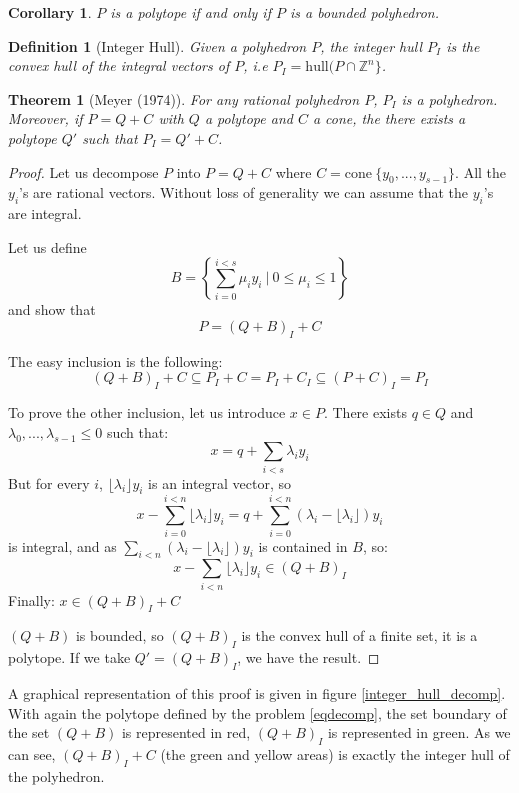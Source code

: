 \documentclass{article}
\newcommand{\cone}{\mathrm{cone}}
\newcommand{\hull}{\mathrm{hull}}
\newcommand{\ints}{\mathbb{Z}}
\newcommand{\ifff}{if and only if}
\newtheorem{definition}{Definition}
\newtheorem{theorem}{Theorem}
\newtheorem{corollary}{Corollary}
\begin{document}
\begin{corollary}
  $P$ is a polytope \ifff{} $P$ is a bounded polyhedron.
\end{corollary}

\begin{definition}[Integer Hull]
  Given a polyhedron $P$, the \textup{integer hull} $P_I$ is the convex hull of
  the integral vectors of $P$, i.e $P_I = \hull (P \cap \ints^n\}$.
\end{definition}

\begin{theorem}[Meyer (1974)]
  For any rational polyhedron $P$, $P_I$ is a polyhedron. Moreover, if
  $P = Q + C$ with $Q$ a polytope and $C$ a cone, the there exists a polytope
  $Q'$ such that $P_I = Q' + C$.
\end{theorem}
\begin{proof}
  Let us decompose $P$ into $P = Q + C$ where
  $C = \cone~\{y_0, ..., y_{s-1}\}$. All the $y_i$'s are rational vectors.
  Without loss of generality we can assume that the $y_i$'s are integral.

  Let us define
  $$B = \left\{\sum_{i=0}^{i<s} \mu_i y_i~|~
               0 \leqslant \mu_i \leqslant 1\right\}$$
  and show that $$P = (Q + B)_I + C$$

  The easy inclusion is the following:
  $$(Q + B)_I + C \subseteq P_I + C = P_I + C_I \subseteq (P + C)_I = P_I$$

  To prove the other inclusion, let us introduce $x \in P$.
  There exists $q \in Q$ and $\lambda_0, ..., \lambda_{s-1}
  \leqslant 0$ such that: $$x = q + \sum_{i < s} \lambda_i y_i$$ But for every
  $i$, $\lfloor \lambda_i \rfloor y_i$ is an integral vector, so
  $$x - \sum_{i=0}^{i<n} \lfloor \lambda_i \rfloor y_i=
      q + \sum_{i=0}^{i<n} (\lambda_i - \lfloor \lambda_i \rfloor) y_i$$
  is integral, and as $\sum_{i<n} (\lambda_i - \lfloor \lambda_i \rfloor) y_i$
  is contained in $B$, so:
  $$x - \sum_{i<n} \lfloor \lambda_i \rfloor y_i \in (Q + B)_I$$
  Finally: $x \in (Q + B)_I + C$

  $(Q + B)$ is bounded, so $(Q + B)_I$ is the convex hull of a finite set, it is
  a polytope. If we take $Q' = (Q + B)_I$, we have the result.
\end{proof}

A graphical representation of this proof is given in figure
\ref{integer_hull_decomp}. With again the polytope defined by the problem
\ref{eqdecomp}, the set boundary of the set $(Q + B)$ is represented
in red, $(Q + B)_I$ is represented in green. As we can see, $(Q + B)_I + C$ (the
green and yellow areas) is exactly the integer hull of the polyhedron.
\end{document}

